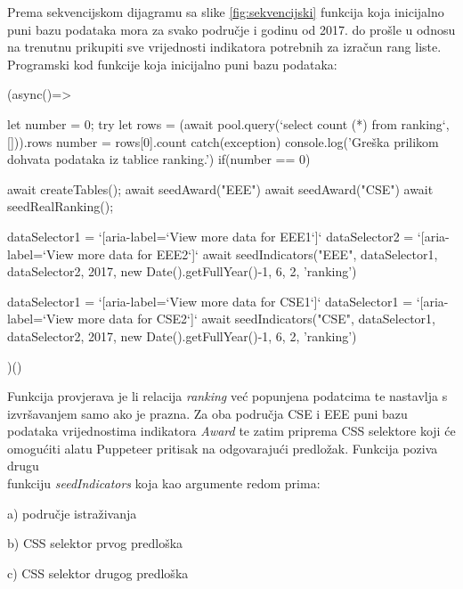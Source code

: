 \documentclass[times, utf8, zavrsni]{fer}
\begin{document}
       \FloatBarrier
Prema sekvencijskom dijagramu sa slike \ref{fig:sekvencijski} funkcija koja inicijalno puni bazu podataka mora za svako područje i
godinu od 2017. do prošle u odnosu na trenutnu prikupiti sve vrijednosti indikatora potrebnih za izračun rang liste.  
\\Programski kod funkcije koja inicijalno puni bazu podataka:        
\begin{verbnobox}[\fontsize{10pt}{10pt}\selectfont]
(async()=>{
    let number = 0;
    try{
        let rows = (await pool.query(`select count (*) 
                        from ranking`, [])).rows
        number = rows[0].count
    } catch(exception){
        console.log('Greška prilikom dohvata podataka iz tablice ranking.')
    }
    if(number == 0){
        await createTables();
        await seedAward("EEE")
        await seedAward("CSE")
        await seedRealRanking();
            
        dataSelector1 = `[aria-label=`View more 
                                data for EEE1`]`
        dataSelector2 = `[aria-label=`View more 
                                data for EEE2`]`
        await seedIndicators("EEE", dataSelector1, 
                                dataSelector2, 2017, 
                                new Date().getFullYear()-1, 
                                6, 2, 'ranking')
    
        dataSelector1 = `[aria-label=`View more
                             data for CSE1`]`
        dataSelector1 = `[aria-label=`View more
                             data for CSE2`]`
        await seedIndicators("CSE", dataSelector1, 
                                dataSelector2, 2017, 
                                new Date().getFullYear()-1,
                                6, 2, 'ranking')
    }
})()
\end{verbnobox}  
Funkcija provjerava je li relacija \emph{ranking} već popunjena podatcima te nastavlja s \\izvršavanjem samo ako je prazna. 
Za oba područja CSE i EEE puni bazu podataka vrijednostima indikatora \emph{Award} te zatim priprema CSS selektore koji će omogućiti alatu 
Puppeteer pritisak na odgovarajući predložak. Funkcija poziva drugu \\funkciju \emph{seedIndicators} koja kao argumente redom prima:

    a) područje istraživanja
    
    b) CSS selektor prvog predloška 

    c) CSS selektor drugog predloška
    
\end{document}
